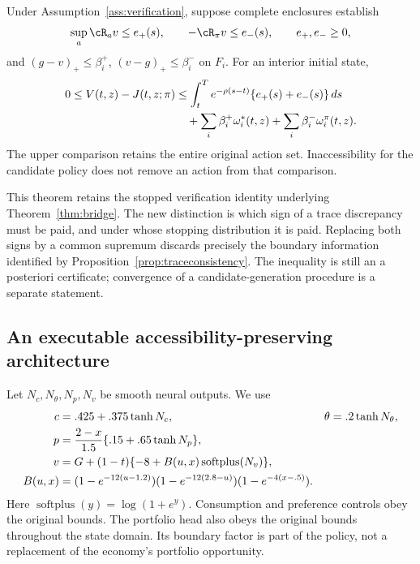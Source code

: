 \begin{theorem}\label{thm:accessibility}
Under Assumption~\ref{ass:verification}, suppose complete enclosures establish
\[
 \sup_a\cR_a v\leq e_+(s),\qquad-\cR_\pi v\leq e_-(s),\qquad e_+,e_-\geq0,
\]
and $(g-v)_+\leq\beta_i^+$, $(v-g)_+\leq\beta_i^-$ on $F_i$. For an interior initial state,
\begin{align}
 0\leq V(t,z)-J(t,z;\pi)
 &\leq\int_t^T e^{-\rho(s-t)}\{e_+(s)+e_-(s)\}\,ds\notag\\
 &\quad+\sum_i\beta_i^+\omega_i^*(t,z)+\sum_i\beta_i^-\omega_i^\pi(t,z).
 \label{eq:accessbound}
\end{align}
The upper comparison retains the entire original action set. Inaccessibility for the candidate policy does not remove an action from that comparison.
\end{theorem}
This theorem retains the stopped verification identity underlying Theorem~\ref{thm:bridge}. The new distinction is which sign of a trace discrepancy must be paid, and under whose stopping distribution it is paid. Replacing both signs by a common supremum discards precisely the boundary information identified by Proposition~\ref{prop:traceconsistency}. The inequality is still an a posteriori certificate; convergence of a candidate-generation procedure is a separate statement.

\subsection{An executable accessibility-preserving architecture}
Let $N_c,N_\theta,N_p,N_v$ be smooth neural outputs. We use
\begin{align}
 c&=.425+.375\tanh N_c,&\theta&=.2\tanh N_\theta,\notag\\
 p&=\frac{2-x}{1.5}\{.15+.65\tanh N_p\},\label{eq:invariantactor}\\
 v&=G+(1-t)\{-8+B(u,x)\operatorname{softplus}(N_v)\},\label{eq:accessiblecritic}\\
 B(u,x)&=(1-e^{-12(u-1.2)})(1-e^{-12(2.8-u)})(1-e^{-4(x-.5)}).\notag
\end{align}
Here $\operatorname{softplus}(y)=\log(1+e^y)$. Consumption and preference controls obey the original bounds. The portfolio head also obeys the original bounds throughout the state domain. Its boundary factor is part of the policy, not a replacement of the economy's portfolio opportunity.

